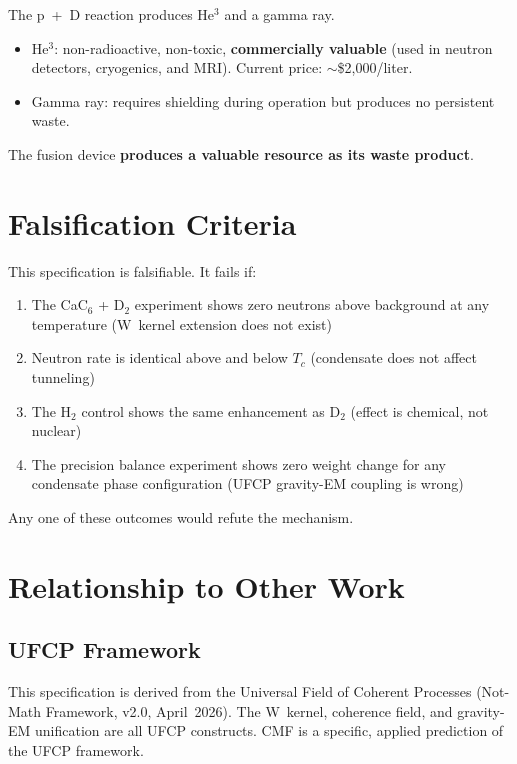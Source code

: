 \documentclass[11pt, a4paper]{article}
\begin{document}
The p~+~D reaction produces He$^3$ and a gamma ray.
\begin{itemize}[nosep]
  \item He$^3$: non-radioactive, non-toxic, \textbf{commercially
        valuable} (used in neutron detectors, cryogenics, and
        MRI). Current price: $\sim$\$2{,}000/liter.
  \item Gamma ray: requires shielding during operation but
        produces no persistent waste.
\end{itemize}

The fusion device \textbf{produces a valuable resource as its
waste product}.

\section{Falsification Criteria}

This specification is falsifiable. It fails if:

\begin{enumerate}[nosep]
  \item The CaC$_6$ + D$_2$ experiment shows zero neutrons
        above background at any temperature (W~kernel
        extension does not exist)
  \item Neutron rate is identical above and below $T_c$
        (condensate does not affect tunneling)
  \item The H$_2$ control shows the same enhancement as D$_2$
        (effect is chemical, not nuclear)
  \item The precision balance experiment shows zero weight
        change for any condensate phase configuration (UFCP
        gravity-EM coupling is wrong)
\end{enumerate}

Any one of these outcomes would refute the mechanism.

\section{Relationship to Other Work}

\subsection{UFCP Framework}

This specification is derived from the Universal Field of
Coherent Processes (Not-Math Framework, v2.0, April~2026).
The W~kernel, coherence field, and gravity-EM unification are
all UFCP constructs. CMF is a specific, applied prediction of
the UFCP framework.
\end{document}

